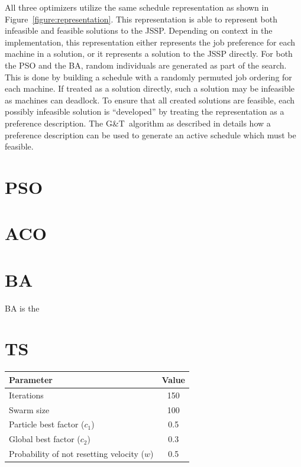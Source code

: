 \documentclass[paper=a4, fontsize=9pt]{scrartcl}
\begin{document}
\begin{multicols}{2}
All three optimizers utilize the same schedule representation as shown in Figure~\ref{figure:representation}. This representation is able to represent both infeasible and feasible solutions to the \ac{JSSP}. Depending on context in the implementation, this representation either represents the job preference for each machine in a solution, or it represents a solution to the \ac{JSSP} directly. For both the \ac{PSO} and the \ac{BA}, random individuals are generated as part of the search. This is done by building a schedule with a randomly permuted job ordering for each machine. If treated as a solution directly, such a solution may be infeasible as machines can deadlock. To ensure that all created solutions are feasible, each possibly infeasible solution is ``developed'' by treating the representation as a preference description. The G\&T~algorithm as described in \cite{sha2006hybrid} details how a preference description can be used to generate an active schedule which must be feasible.

\section*{\acl{PSO}}


\section*{\acl{ACO}}


\section*{\acl{BA}}




BA is the

\section*{\acl{TS}}

{
\begin{minipage}{\linewidth{}}
\centering
\begin{tabular}{lc}
\toprule
Parameter                                   & Value \\
\midrule
Iterations                                  & 150   \\
Swarm size                                  & 100   \\
Particle best factor ($c_1$)                &   0.5 \\
Global best factor ($c_2$)                  &   0.3 \\
Probability of not resetting velocity ($w$) &   0.5 \\
\bottomrule
\end{tabular}
\label{table:psoparams}
\end{minipage}
}


\end{multicols}
\end{document}
